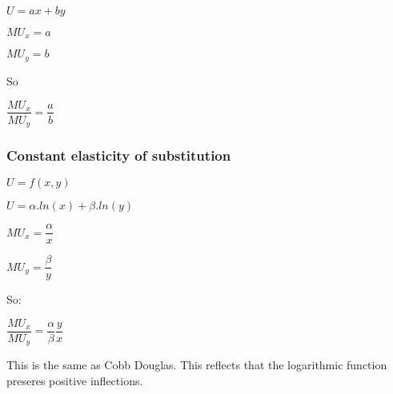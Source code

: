 \(U=ax+by\)

\(MU_x=a\)

\(MU_y=b\)

So

\(\dfrac{MU_x}{MU_y}=\dfrac{a}{b}\)

\subsubsection{Constant elasticity of substitution}

\(U=f(x,y)\)

\(U=\alpha .ln(x)+\beta .ln(y)\)

\(MU_x=\dfrac{\alpha }{x}\)

\(MU_y=\dfrac{\beta }{y}\)

So:

\(\dfrac{MU_x}{MU_y}=\dfrac{\alpha }{\beta }\dfrac{y}{x}\)

This is the same as Cobb Douglas. This reflects that the logarithmic function preseres positive inflections.

